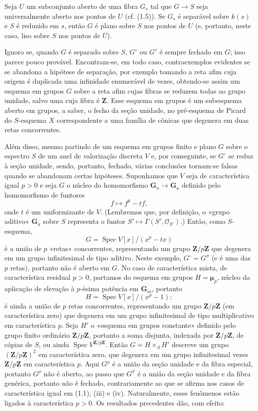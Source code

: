 Seja $U$ um subconjunto aberto de uma fibra $G_s$ tal
que $G\longrightarrow S$ seja universalmente aberto nos pontos de $U$ (cf.
(1.5)). Se $G_s$ é separável sobre $k(s)$ e $S$ é reduzido em $s$, então $G$ é
plano sobre $S$ nos pontos de $U$ (e, portanto, neste caso, liso sobre $S$ nos
pontos de $U$).

 Ignoro se, quando $G$ é separado sobre $S$,
$G^\circ$ ou $G^\tau$ é sempre fechado em $G$; isso parece pouco provável.
Encontram-se, em todo caso, contraexemplos evidentes se se abandona a hipótese
de separação, por exemplo tomando a reta afim cuja origem é duplicada uma
infinidade enumerável de vezes, obtendo-se assim um esquema em grupos $G$ sobre
a reta afim cujas fibras se reduzem todas ao grupo unidade, salvo uma cuja
fibra é $\mathbf Z$. Esse esquema em grupos é um subesquema aberto em grupos,
a saber, o fecho da seção unidade, no pré-esquema de Picard do $S$-esquema $X$
correspondente a uma família de cônicas que degenera em duas retas concorrentes.

Além disso, mesmo partindo de um esquema em grupos finito e plano $G$ sobre o
espectro $S$ de um anel de valorização discreta $V$ e, por conseguinte, se
$G^\circ$ se reduz à seção unidade, sendo, portanto, fechado, várias
conclusões tornam-se falsas quando se abandonam certas hipóteses. Suponhamos
que $V$ seja de característica igual $p>0$ e seja $G$ o núcleo do homomorfismo
$\mathbf G_a\longrightarrow\mathbf G_a$ definido pelo homomorfismo de
funtores
\[
f\longmapsto f^p-tf,
\]
onde $t$ é um uniformizante de $V$.
(Lembremos que, por definição, o «grupo aditivo» $\mathbf G_a$ sobre $S$
representa o funtor $S'\longmapsto\Gamma(S',\mathcal O_{S'})$.) Então, como
$S$-esquema,
\[
G=\operatorname{Spec}V[x]/(x^p-tx)
\]
é a união de $p$ «retas» concorrentes, representando um grupo
$\mathbf Z/p\mathbf Z$ que degenera em um grupo infinitesimal de tipo aditivo.
Neste exemplo, $G^\circ=G^\sigma$ (e é uma das $p$ retas), portanto não é
aberto em $G$. No caso de característica mista, de característica residual
$p>0$, partamos do esquema em grupos $H=\boldsymbol\mu_p$, núcleo da aplicação
de elevação à $p$-ésima potência em $\mathbf G_m$, portanto
\[
H=\operatorname{Spec}V[x]/(x^p-1) ;
\]
é ainda a união de $p$ retas concorrentes, representando um grupo
$\mathbf Z/p\mathbf Z$ (em característica zero) que degenera em um grupo
infinitesimal de tipo multiplicativo em característica $p$. Seja $H'$ o
«esquema em grupos constante» definido pelo grupo finito ordinário
$\mathbf Z/p\mathbf Z$, portanto a soma disjunta, indexada por
$\mathbf Z/p\mathbf Z$, de cópias de $S$, ou ainda
$\operatorname{Spec}V^{\mathbf Z/p\mathbf Z}$. Então $G=H\times_S H'$ descreve
um grupo $(\mathbf Z/p\mathbf Z)^2$ em característica zero, que degenera em um
grupo infinitesimal vezes $\mathbf Z/p\mathbf Z$ em característica $p$. Aqui
$G^\rho$ é a união da seção unidade e da fibra especial, portanto $G^\rho$ não
é aberto, ao passo que $G^\sigma$ é a união da seção unidade e da fibra
genérica, portanto não é fechado, contrariamente ao que se afirma nos casos de
característica igual em (1.1), (iii) e (iv). Naturalmente, esses fenômenos estão
ligados à característica $p>0$. Os resultados precedentes dão, com efeito:

